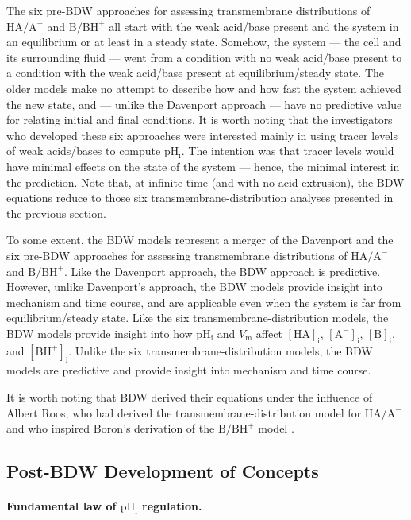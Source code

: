 \documentclass[fleqn,10pt]{physiome}
\begin{document}
The six pre-BDW approaches for assessing transmembrane distributions of $\mathrm{HA}/\mathrm{A^-}$ and $\mathrm{B}/\mathrm{BH^+}$ all start with the weak acid/base present and the system in an equilibrium or at least in a steady state. Somehow, the system --- the cell and its surrounding fluid --- went from a condition with no weak acid/base present to a condition with the weak acid/base present at equilibrium/steady state. The older models make no attempt to describe how and how fast the system achieved the new state, and --- unlike the Davenport approach --- have no predictive value for relating initial and final conditions. It is worth noting that the investigators who developed these six approaches were interested mainly in using tracer levels of weak acids/bases to compute $\mathrm{pH_i}$. The intention was that tracer levels would have minimal effects on the state of the system --- hence, the minimal interest in the prediction. Note that, at infinite time (and with no acid extrusion), the BDW equations reduce to those six transmembrane-distribution analyses presented in the previous section.

To some extent, the BDW models represent a merger of the Davenport and the six pre-BDW approaches for assessing transmembrane distributions of $\mathrm{HA}/\mathrm{A^-}$ and $\mathrm{B}/\mathrm{BH^+}$. Like the Davenport approach, the BDW approach is predictive. However, unlike Davenport's approach, the BDW models provide insight into mechanism and time course, and are applicable even when the system is far from equilibrium/steady state. Like the six transmembrane-distribution models, the BDW models provide insight into how $\mathrm{pH_i}$ and $V_\mathrm{m}$ affect $\mathrm{[HA]_i}$, $\mathrm{[A^-]_i}$, $\mathrm{[B]_i}$, and $\mathrm{[BH^+]_i}$. Unlike the six transmembrane-distribution models, the BDW models are predictive and provide insight into mechanism and time course.

It is worth noting that BDW derived their equations under the influence of Albert Roos, who had derived the transmembrane-distribution model for $\mathrm{HA}/\mathrm{A^-}$ \citep{roos1975intracellular} and who inspired Boron's derivation of the $\mathrm{B}/\mathrm{BH^+}$ model \citep{boron1976comparison}.

\subsection{Post-BDW Development of Concepts}
\paragraph{Fundamental law of $\mathrm{pH_i}$ regulation.}
\end{document}
